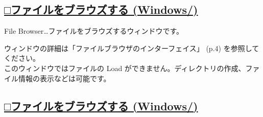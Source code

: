 \documentclass[a4paper,10pt]{article}
\begin{document}
\newpage

\subsection*{\uline{□ファイルをブラウズする (Windows/)}}

\normalsize
\noindent File Browser…ファイルをブラウズするウィンドウです。\par
\footnotesize
\noindent ウィンドウの詳細は「ファイルブラウザのインターフェイス」 (p.4) を参照してください。\\
このウィンドウではファイルの Load ができません。ディレクトリの作成、ファイル情報の表示などは可能です。\\

\subsection*{\uline{□ファイルをブラウズする (Windows/)}}
\end{document}
